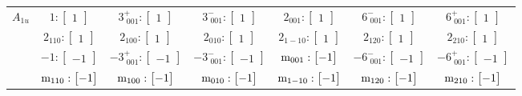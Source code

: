 \documentclass[fleqn,8pt,landscape]{jsarticle}
\begin{document}
\begin{longtable}{ccccccc}
$ A_{1u} $ & $ 1:\begin{bmatrix} 1 \end{bmatrix} $ & $ 3^{+}_{\,\,001}:\begin{bmatrix} 1 \end{bmatrix} $ & $ 3^{-}_{\,\,001}:\begin{bmatrix} 1 \end{bmatrix} $ & $ 2{}_{001}:\begin{bmatrix} 1 \end{bmatrix} $ & $ 6^{-}_{\,\,001}:\begin{bmatrix} 1 \end{bmatrix} $ & $ 6^{+}_{\,\,001}:\begin{bmatrix} 1 \end{bmatrix} $ \\
& $ 2{}_{110}:\begin{bmatrix} 1 \end{bmatrix} $ & $ 2{}_{100}:\begin{bmatrix} 1 \end{bmatrix} $ & $ 2{}_{010}:\begin{bmatrix} 1 \end{bmatrix} $ & $ 2{}_{1-10}:\begin{bmatrix} 1 \end{bmatrix} $ & $ 2{}_{120}:\begin{bmatrix} 1 \end{bmatrix} $ & $ 2{}_{210}:\begin{bmatrix} 1 \end{bmatrix} $ \\
& $ -1:\begin{bmatrix} -1 \end{bmatrix} $ & $ -3^{+}_{\,\,001}:\begin{bmatrix} -1 \end{bmatrix} $ & $ -3^{-}_{\,\,001}:\begin{bmatrix} -1 \end{bmatrix} $ & $ {\rm m}_{001}:\begin{bmatrix} -1 \end{bmatrix} $ & $ -6^{-}_{\,\,001}:\begin{bmatrix} -1 \end{bmatrix} $ & $ -6^{+}_{\,\,001}:\begin{bmatrix} -1 \end{bmatrix} $ \\
& $ {\rm m}_{110}:\begin{bmatrix} -1 \end{bmatrix} $ & $ {\rm m}_{100}:\begin{bmatrix} -1 \end{bmatrix} $ & $ {\rm m}_{010}:\begin{bmatrix} -1 \end{bmatrix} $ & $ {\rm m}_{1-10}:\begin{bmatrix} -1 \end{bmatrix} $ & $ {\rm m}_{120}:\begin{bmatrix} -1 \end{bmatrix} $ & $ {\rm m}_{210}:\begin{bmatrix} -1 \end{bmatrix} $ \\ \hline

\end{longtable}
\end{document}
